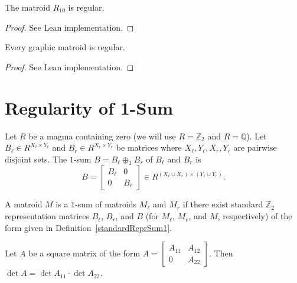 \begin{theorem}
    \label{matroidR10.isRegular}
    \leanok
    The matroid $R_{10}$ is regular.
\end{theorem}

\begin{proof}
    \leanok
    See Lean implementation.
\end{proof}

\begin{theorem}
    \label{Matroid.IsGraphic.isRegular}
    \leanok
    Every graphic matroid is regular.
\end{theorem}

\begin{proof}
    \leanok
    See Lean implementation.
\end{proof}


\chapter{Regularity of 1-Sum}

\begin{definition}
    \label{standardReprSum1}
    \leanok
    Let $R$ be a magma containing zero (we will use $R = \mathbb{Z}_{2}$ and $R = \mathbb{Q}$). Let $B_{\ell} \in R^{X_{\ell} \times Y_{\ell}}$ and $B_{r} \in R^{X_{r} \times Y_{r}}$ be matrices where $X_{\ell}, Y_{\ell}, X_{r}, Y_{r}$ are pairwise disjoint sets. The $1$-sum $B = B_{\ell} \oplus_{1} B_{r}$ of $B_{\ell}$ and $B_{r}$ is
    \[
        B = \begin{bmatrix} B_{\ell} & 0 \\ 0 & B_{r} \end{bmatrix} \in R^{(X_{\ell} \cup X_{r}) \times (Y_{\ell} \cup Y_{r})}.
    \]
\end{definition}

\begin{definition}
    \label{Matroid.IsSum1of}
    \leanok
    A matroid $M$ is a $1$-sum of matroids $M_{\ell}$ and $M_{r}$ if there exist standard $\mathbb{Z}_{2}$ representation matrices $B_{\ell}$, $B_{r}$, and $B$ (for $M_{\ell}$, $M_{r}$, and $M$, respectively) of the form given in Definition~\ref{standardReprSum1}.
\end{definition}

\begin{lemma}
    \label{Matrix.det_fromBlocks_zero}
    \leanok
    Let $A$ be a square matrix of the form $A = \begin{bmatrix} A_{11} & A_{12} \\ 0 & A_{22} \end{bmatrix}$. Then $\det A = \det A_{11} \cdot \det A_{22}$.
\end{lemma}

